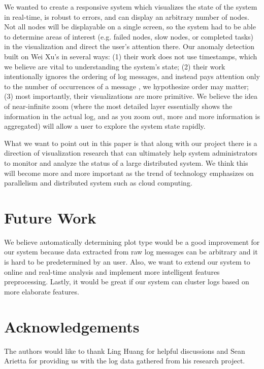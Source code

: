 \documentclass[conference]{style/acmsiggraph}
\begin{document}
We wanted to create a responsive system which visualizes the state of the system in real-time, is
robust to errors, and can display an arbitrary number of nodes. Not all nodes will be displayable on
a single screen, so the system had to be able to determine areas of interest (e.g. failed nodes,
slow nodes, or completed tasks) in the visualization and direct the user’s attention there. Our
anomaly detection built on Wei Xu's in several ways: (1) their work does not use timestamps, which
we believe are vital to understanding the system’s state; (2) their work intentionally ignores the
ordering of log messages, and instead pays attention only to the number of occurrences of a message
, we hypothesize order may matter; (3) most importantly, their visualizations are more primitive. We
believe the idea of near-infinite zoom (where the most detailed layer essentially shows the
information in the actual log, and as you zoom out, more and more information is aggregated) will
allow a user to explore the system state rapidly.

What we want to point out in this paper is that along with our project there is a direction of
visualization research that can ultimately help system administrators to monitor and analyze the
status of a large distributed system. We think this will become more and more important as the trend
of technology emphasizes on parallelism and distributed system such as cloud computing.


\section{Future Work}

We believe automatically determining plot type would be a good improvement for our system because
data extracted from raw log messages can be arbitrary and it is hard to be predetermined by an user.
Also, we want to extend our system to online and real-time analysis and implement more intelligent
features preprocessing. Lastly, it would be great if our system can cluster logs based on more
elaborate features.

\section*{Acknowledgements}
The authors would like to thank Ling Huang for helpful discussions and Sean Arietta for providing us with the log data gathered from his research project.




\end{document}
